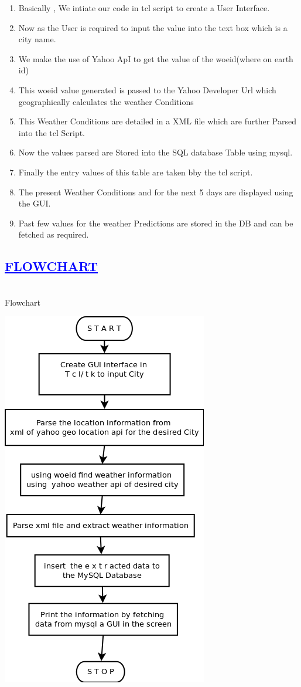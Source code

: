 \documentclass[a4paper,12pt]{report}
\begin{document}
\begin{enumerate}
\item Basically , We intiate our code in tcl script to create a User Interface.
\item Now as the User is required to input the value into the text box which is a city name.
\item We make the use of Yahoo ApI to get the value of the woeid(where on earth id)
\item This woeid value generated is passed to the Yahoo Developer Url which geographically calculates the weather Conditions
\item This Weather Conditions are detailed in a XML file which are further Parsed into the tcl Script.
\item Now the values parsed are Stored into the SQL database Table using mysql.
\item Finally the entry values of this table are taken bby the tcl script.
\item The present Weather Conditions and for the next 5 days are displayed using the GUI.
\item Past few values for the weather Predictions are stored in the DB and can be fetched as required.
\end{enumerate}

\begin{center}
\chapter{\textcolor{blue}{\underline {FLOWCHART}}}
\end{center}
\noindent \\Flowchart
\begin{center}
 \includegraphics[width=13 cm,height=12 cm]{./flowchart.png}
\end{center}
\end{document}
